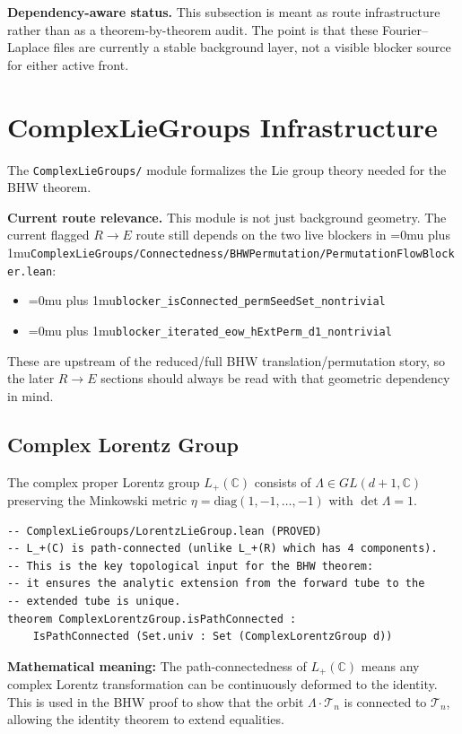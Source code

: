 \documentclass[11pt,a4paper]{article}
\newcommand{\leanfile}[1]{\begingroup\Urlmuskip=0mu plus 1mu\relax\nolinkurl{#1}\endgroup}
\newcommand{\leanname}[1]{\begingroup\Urlmuskip=0mu plus 1mu\relax\nolinkurl{#1}\endgroup}
\begin{document}
\medskip\noindent
\textbf{Dependency-aware status.}
This subsection is meant as route infrastructure rather than as a theorem-by-theorem
audit. The point is that these Fourier--Laplace files are currently a stable
background layer, not a visible blocker source for either active front.

\section{ComplexLieGroups Infrastructure}

The \texttt{ComplexLieGroups/} module formalizes the Lie group theory needed
for the BHW theorem.

\medskip\noindent
\textbf{Current route relevance.}
This module is not just background geometry. The current flagged $R \to E$
route still depends on the two live blockers in
\leanfile{ComplexLieGroups/Connectedness/BHWPermutation/PermutationFlowBlocker.lean}:
\begin{itemize}
\item \leanname{blocker\_isConnected\_permSeedSet\_nontrivial}
\item \leanname{blocker\_iterated\_eow\_hExtPerm\_d1\_nontrivial}
\end{itemize}

\noindent
These are upstream of the reduced/full BHW translation/permutation story, so the
later $R \to E$ sections should always be read with that geometric dependency in
mind.

\subsection{Complex Lorentz Group}

The complex proper Lorentz group $L_+(\mathbb{C})$ consists of
$\Lambda \in GL(d{+}1, \mathbb{C})$ preserving the Minkowski metric
$\eta = \mathrm{diag}(1, -1, \ldots, -1)$ with $\det \Lambda = 1$.

\begin{lstlisting}
-- ComplexLieGroups/LorentzLieGroup.lean (PROVED)
-- L_+(C) is path-connected (unlike L_+(R) which has 4 components).
-- This is the key topological input for the BHW theorem:
-- it ensures the analytic extension from the forward tube to the
-- extended tube is unique.
theorem ComplexLorentzGroup.isPathConnected :
    IsPathConnected (Set.univ : Set (ComplexLorentzGroup d))
\end{lstlisting}

\noindent\textbf{Mathematical meaning:} The path-connectedness of
$L_+(\mathbb{C})$ means any complex Lorentz transformation can be
continuously deformed to the identity. This is used in the BHW proof
to show that the orbit $\Lambda \cdot \mathscr{T}_n$ is connected to
$\mathscr{T}_n$, allowing the identity theorem to extend equalities.
\end{document}
